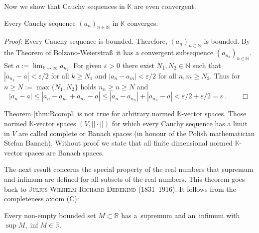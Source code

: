 


Now we show that Cauchy sequences in $\mathbb{K}$ are even convergent:
\begin{Theorem}{}\label{thm:Rcompl}
Every Cauchy sequence $(a_n)_{n\in\mathbb{N}}$ in $\mathbb{K}$ converges.
\end{Theorem}

{\em Proof:} 
Every Cauchy sequence is bounded. Therefore, $(a_n)_{n\in\mathbb{N}}$ is bounded. By the Theorem of Bolzano-Weierstra\ss \ it has a convergent 
subsequence $(a_{n_k})_{k\in\mathbb{N}}$. Set $a:=\lim_{k\rightarrow\infty} a_{n_k}$. For given $\varepsilon>0$ there exist $N_1,N_2\in\mathbb{N}$ such 
that $|a_{n_k}-a|<\varepsilon/2$ for all $k\geq N_1$ and $|a_n-a_m|<\varepsilon/2$ for all $n,m\geq N_2$. Thus for $n\geq N:=\max\{N_1,N_2\}$ holds
$n_n\geq n\geq N$ and $$|a_n-a|\leq|a_n-a_{n_n}+a_{n_n}-a|\leq|a_n-a_{n_n}|+|a_{n_n}-a|< \varepsilon/2+\varepsilon/2=\varepsilon \ . \qquad\Box$$

Theorem \ref{thm:Rcompl} is not true for arbitrary normed $\mathbb{K}$-vector spaces. 
Those normed $\mathbb{K}$-vector spaces $(V,||\cdot||)$ for which every Cauchy sequence has a limit in $V$ are called complete
or Banach spaces (in honour of the Polish mathematician Stefan Banach). 
Without proof we state that all finite dimensional normed $\mathbb{K}$-vector spaces are Banach spaces.

The next result concerns the special property of the real numbers that supremum and infimum are defined for all subsets of the real numbers. This theorem goes back to \textsc{Julius Wilhelm Richard Dedekind} (1831--1916). It follows from the completeness axiom (C):
\begin{Theorem}
\label{thm:bndmonseq}
    Every non-empty bounded set $M\subset \mathbb{R}$ has a~supremum and an~infimum with $\sup M,\inf M\in\mathbb{R}$.
\end{Theorem}

